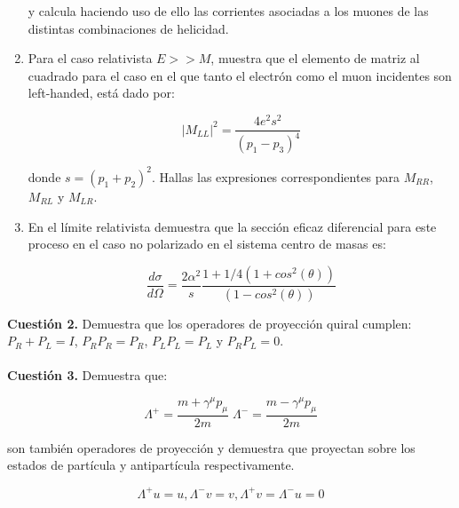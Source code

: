 \documentclass[paper=a4, fontsize=11pt]{scrartcl} %
\numberwithin{equation}{section} %
\numberwithin{figure}{section} %
\numberwithin{table}{section} %
\begin{document}
\begin{enumerate}
y calcula haciendo uso de ello las corrientes asociadas a los muones de las distintas combinaciones de helicidad.

\item Para el caso relativista $E>>M$, muestra que el elemento de matriz al cuadrado para el caso en el que tanto el electrón como el muon incidentes son left-handed, está dado por: 

\begin{equation*}
|M_{LL}|^2 = \frac{4e^2s^2}{(p_1-p_3)^4}
\end{equation*}

donde $s = (p_1 + p_ 2)^2$. Hallas las expresiones correspondientes para $M_{RR}$, $M_{RL}$ y $M_{LR}$.

\item En el límite relativista demuestra que la sección eficaz diferencial para este proceso en el caso no polarizado en el sistema centro de masas es:

\begin{equation*}
\frac{d\sigma}{d\Omega} = \frac{2\alpha^2}{s} \frac{1 + 1/4(1 + cos^2(\theta))}{(1-cos^2(\theta))}
\end{equation*}

\end{enumerate}

\textbf{Cuestión 2.} Demuestra que los operadores de proyección quiral cumplen: $P_R + P_L = I$, $P_RP_R=P_R$, $P_LP_L=P_L$ y $P_RP_L=0$. 
\\
\\
\textbf{Cuestión 3.} Demuestra que:

\begin{equation*}
\Lambda^+ = \frac{m+\gamma^\mu p_\mu}{2m}\; \Lambda^- = \frac{m-\gamma^\mu p_\mu}{2m} 
\end{equation*}

son también operadores de proyección y demuestra que proyectan sobre los estados de partícula y antipartícula respectivamente.

\begin{equation*}
\Lambda^+ u= u, \Lambda^- v= v, \Lambda^+ v = \Lambda^- u = 0 
\end{equation*}
\end{document}
